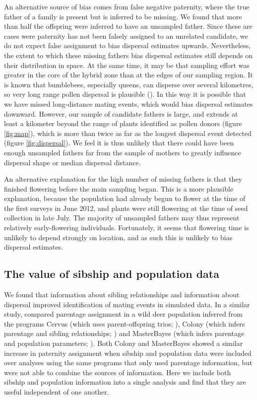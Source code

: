 \documentclass[10pt, a4paper, twocolumn]{article} %
\begin{document}
An alternative source of bias comes from false negative paternity, where the true father of a family is present but is inferred to be missing.
We found that more than half the offspring were inferred to have an unsampled father.
Since these are cases were paternity has not been falsely assigned to an unrelated candidate, we do not expect false assignment to bias dispersal estimates upwards.
Nevertheless, the extent to which these missing fathers bias dispersal estimates still depends on their distribution in space.
At the same time, it may be that sampling effort was greater in the core of the hybrid zone than at the edges of our sampling region.
It is known that bumblebees, especially queens, can disperse over several kilometres, so very long range pollen dispersal is plausible (\cite{osborne2008bumblebee, hagen2011space, lepais2010estimation}).
In this way it is possible that we have missed long-distance mating events, which would bias dispersal estimates downward.
However, our sample of candidate fathers is large, and extends at least a kilometer beyond the range of plants identified as pollen donors (figure \ref{fig:map}), which is more than twice as far as the longest dispersal event detected (figure \ref{fig:dispersal}).
We feel it is thus unlikely that there could have been enough unsampled fathers far from the sample of mothers to greatly influence dispersal shape or median dispersal distance.

An alternative explanation for the high number of missing fathers is that they finished flowering before the main sampling began.
This is a more plausible explanation, because the population had already begun to flower at the time of the first surveys in June 2012, and plants were still flowering at the time of seed collection in late 
July.
The majority of unsampled fathers may thus represent relatively early-flowering individuals.
Fortunately, it seems that flowering time is unlikely to depend strongly on location, and as such this is unlikely to bias dispersal estimates.

\subsection{The value of sibship and population data}

We found that information about sibling relationships and information about dispersal improved identification of mating events in simulated data.
In a similar study, \cite{walling2010comparing} compared parentage assignment in a wild deer population inferred from the programs Cervus (which uses parent-offspring trios; \cite{marshall1998statistical}), Colony (which infers parentage and sibling relationships; \cite{wang2009parentage}) and MasterBayes (which infers parentage and population parameters; \cite{hadfield2006towards}).
Both Colony and MasterBayes showed a similar increase in paternity assignment when sibship and population data were included over analyses using the same programs that only used parentage information, but were not able to combine the sources of information.
Here we include both sibship and population information into a single analysis and find that they are useful independent of one another.
\end{document}
